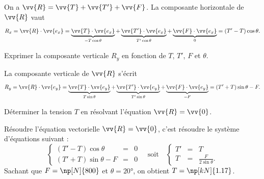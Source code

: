 \begin{corrige}
	On a $\vv{R}=\vv{T}+\vv{T'}+\vv{F}$. La composante horizontale de $\vv{R}$ vaut 
	\[
		R_x=\vv{R}\cdot \vv{e_x}=
		\underbrace{\vv{T}\cdot \vv{e_x}}_{-T\cos\theta}+
		\underbrace{\vv{T'}\cdot \vv{e_x}}_{T'\cos\theta}+
		\underbrace{\vv{F}\cdot \vv{e_x}}_{0}
		=(T'-T)\cos\theta.
	\]
\end{corrige}




\begin{enonce}
	 Exprimer la composante verticale $R_y$ en fonction de $T$, $T'$, $F$ et $\theta$.
\end{enonce}


\begin{corrige}
	La composante verticale de $\vv{R}$ s'écrit 
	\[
		R_y=\vv{R}\cdot \vv{e_y}=
		\underbrace{\vv{T}\cdot \vv{e_y}}_{T\sin\theta}+
		\underbrace{\vv{T'}\cdot \vv{e_y}}_{T'\sin\theta}+
		\underbrace{\vv{F}\cdot \vv{e_y}}_{-F}
		=(T'+T)\sin\theta-F.
	\]
\end{corrige}





\begin{enonce}
Déterminer la tension $T$ en résolvant l'équation $\vv{R}=\vv{0}$.
\end{enonce}


\begin{corrige}
	Résoudre l'équation vectorielle $\vv{R}=\vv{0}$, c'est résoudre le système d'équations suivant :
	\[
		\left\{\begin{array}{rcl}
			(T'-T)\cos\theta	&=& 0\\
			(T'+T)\sin\theta-F	&=& 0
		\end{array}	\right.
		\quad\text{soit}\quad
		\left\{\begin{array}{rcl}
			T'	&=& T\\
			T	&=& \frac{F}{2\sin\theta}.
		\end{array}	\right.
	\]
	Sachant que $F=\np[N]{800}$ et $\theta=\ang{20}$, on obtient $T=\np[kN]{1.17}$.
\end{corrige}

